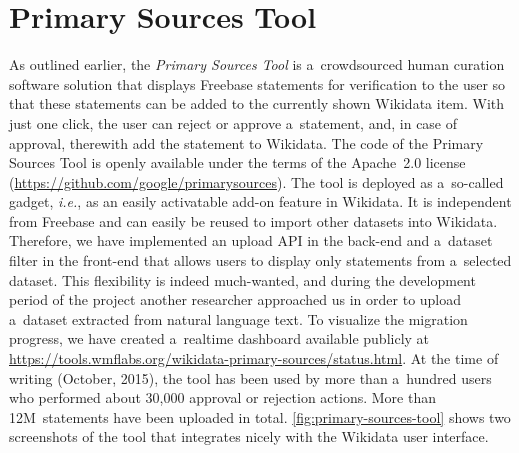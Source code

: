 \documentclass{acm_proc_article-sp}
\begin{document}
\section{Primary Sources Tool}\label{sec:primary-sources-tool}

As outlined earlier, the \emph{Primary Sources Tool} is a~crowdsourced human curation
software solution that displays Freebase statements for verification to the user
so that these statements can be added to the currently shown Wikidata item.
With just one click, the user can reject or approve a~statement,
and, in case of approval, therewith add the statement to Wikidata.
The code of the Primary Sources Tool is openly available
under the terms of the Apache~2.0 license (\url{https://github.com/google/primarysources}).
The tool is deployed as a~so-called gadget,
\emph{i.e.}, as an easily activatable add-on feature in Wikidata.
It is independent from Freebase and can easily be reused to import other datasets into Wikidata.
Therefore, we have implemented an upload API in the back-end
and a~dataset filter in the front-end that allows users
to display only statements from a~selected dataset.
This flexibility is indeed much-wanted, and during the development period of the project
another researcher approached us in order to upload
a~dataset extracted from natural language text.
To visualize the migration progress, we have created a~realtime dashboard
available publicly at \url{https://tools.wmflabs.org/wikidata-primary-sources/status.html}.
At the time of writing (October, 2015), the tool has been used by more than a~hundred users
who performed about 30,000 approval or rejection actions.
More than 12M~statements have been uploaded in total.
\autoref{fig:primary-sources-tool} shows two screenshots
of the tool that integrates nicely with the Wikidata user interface.
\end{document}
